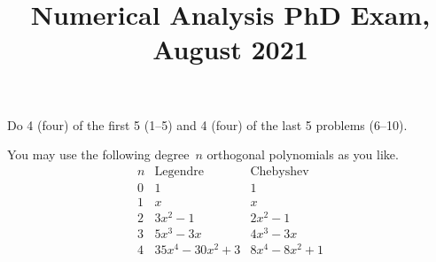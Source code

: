 \documentclass[11pt,letterpaper]{article}
\title{Numerical Analysis PhD Exam, August 2021}
\author{}
\date{}
\newenvironment{examinstructions}{%
  \par\begingroup\itshape
}{%
  \par\endgroup\vspace{0.18em}
}
\begin{document}
\maketitle
\thispagestyle{empty}
\begin{examinstructions}
Do 4 (four) of the first 5 (1–5) and 4 (four) of the last 5 problems (6–10).

\par
You may use the following degree~\(n\) orthogonal polynomials as you like.
\[
\begin{array}{c|c|c}
n & \text{Legendre} & \text{Chebyshev} \\
\hline
0 & 1 & 1 \\
1 & x & x \\
2 & 3x^2-1 & 2x^2-1 \\
3 & 5x^3-3x & 4x^3-3x \\
4 & 35x^4-30x^2+3 & 8x^4-8x^2+1
\end{array}
\]
\end{examinstructions}
\end{document}
